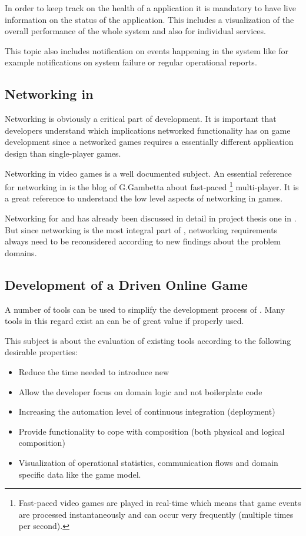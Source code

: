 In order to keep track on the health of a \ms{} application it is mandatory to
have live information on the status of the application. This includes a
visualization of the overall performance of the whole system and also for
individual services.

This topic also includes notification on events happening in the system like for
example notifications on system failure or regular operational reports. 

\subsection{Networking in \ogs{}}
\label{sub:networking_in_online_games}

Networking is obviously a critical part of \og{} development. It is important
that developers understand which implications networked functionality has on
game development since a networked games requires a essentially different
application design than single-player games. 

Networking in video games is a well documented subject. An essential reference
for networking in \ogs{} is the blog of G.Gambetta\cite{gambetta_fast_paced}
about fast-paced \footnote{Fast-paced video games are played in real-time which
means that game events are processed instantaneously and can occur very
frequently (multiple times per second).} multi-player.
It is a great reference to understand the low level aspects of networking in games.

Networking for \mss{} and \og{} has already been discussed in detail in project
thesis one in . But since networking is the
most integral part of \ogs{}, networking requirements always need to be
reconsidered according to new findings about the problem domains.


\subsection{Development of a \ms{} Driven Online Game}

A number of tools can be used to simplify the development process of \ms{}. Many
tools in this regard exist an can be of great value if properly used.

This subject is about the evaluation of existing tools according to the
following desirable properties:

\begin{itemize}
  \item Reduce the time needed to introduce new \mss{}
  \item Allow the developer focus on domain logic and not boilerplate code
  \item Increasing the automation level of continuous integration (deployment)
  \item Provide functionality to cope with \mss{} composition (both physical
  and logical composition)
  \item Visualization of operational statistics, communication flows and domain
  specific data like the game model.
\end{itemize}

